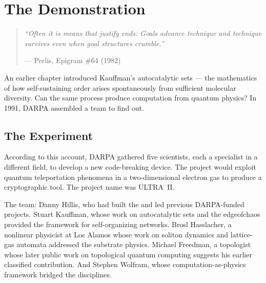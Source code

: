 
\chapter{The Demonstration}
\label{record:demonstration}
\argusvoice%

\begin{quote}\small\textit{%
``Often it is means that justify ends: Goals advance technique and technique survives even when goal structures crumble.''%
}\par\raggedleft --- Perlis, Epigram \#64 (1982)\end{quote}

\vspace{0.5cm}


An earlier chapter introduced Kauffman's autocatalytic sets --- the mathematics of how self-sustaining order arises spontaneously from sufficient molecular diversity. Can the same process produce computation from quantum physics? In 1991, DARPA assembled a team to find out.

\section*{The Experiment}
\label{record:demo-the-experiment}

According to this account, DARPA gathered five scientists, each a specialist in a different field, to develop a new code-breaking device. The project would exploit quantum teleportation phenomena in a two-dimensional electron gas to produce a cryptographic tool. The project name was ULTRA~II.

The team: Danny Hillis, who had built the  and led previous DARPA-funded projects. Stuart Kauffman, whose work on autocatalytic sets and the \gls{edgeofchaos} provided the framework for self-organizing networks. Brosl Hasslacher, a nonlinear physicist at Los Alamos whose work on soliton dynamics and lattice-gas automata addressed the substrate physics. Michael Freedman, a topologist whose later public work on topological quantum computing suggests his earlier classified contribution. And Stephen Wolfram, whose computation-as-physics framework bridged the disciplines.


